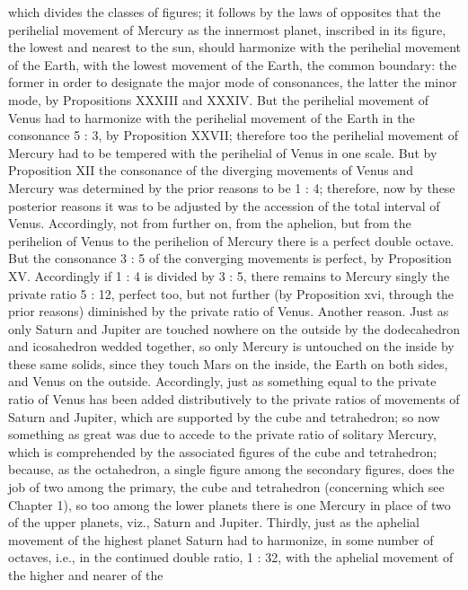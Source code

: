 \documentclass{article}
\begin{document}
which divides the classes of figures; it follows by the laws of opposites
that the perihelial movement of Mercury as the innermost planet,
inscribed in its figure, the lowest and nearest to the sun, should
harmonize with the perihelial movement of the Earth, with the lowest
movement of the Earth, the common boundary: the former in order to
designate the major mode of consonances, the latter the minor mode, by
Propositions XXXIII and XXXIV. But the perihelial movement of Venus
had to harmonize with the perihelial movement of the Earth in the
consonance 5 : 3, by Proposition XXVII; therefore too the perihelial
movement of Mercury had to be tempered with the perihelial of Venus in
one scale. But by Proposition XII the consonance of the diverging
movements of Venus and Mercury was determined by the prior reasons
to be 1 : 4; therefore, now by these posterior reasons it was to be adjusted
by the accession of the total interval of Venus. Accordingly, not from
further on, from the aphelion, but from the perihelion of Venus to the
perihelion of Mercury there is a perfect double octave. But the
consonance 3 : 5 of the converging movements is perfect, by Proposition
XV. Accordingly if 1 : 4 is divided by 3 : 5, there remains to Mercury
singly the private ratio 5 : 12, perfect too, but not further (by Proposition
xvi, through the prior reasons) diminished by the private ratio of Venus.
Another reason. Just as only Saturn and Jupiter are touched nowhere on
the outside by the dodecahedron and icosahedron wedded together, so
only Mercury is untouched on the inside by these same solids, since they
touch Mars on the inside, the Earth on both sides, and Venus on the
outside. Accordingly, just as something equal to the private ratio of
Venus has been added distributively to the private ratios of movements
of Saturn and Jupiter, which are supported by the cube and tetrahedron;
so now something as great was due to accede to the private ratio of
solitary Mercury, which is comprehended by the associated figures of the
cube and tetrahedron; because, as the octahedron, a single figure among
the secondary figures, does the job of two among the primary, the cube
and tetrahedron (concerning which see Chapter 1), so too among the
lower planets there is one Mercury in place of two of the upper
planets, viz., Saturn and Jupiter.
Thirdly, just as the aphelial movement of the highest planet Saturn had
to harmonize, in some number of octaves, i.e., in the continued double
ratio, 1 : 32, with the aphelial movement of the higher and nearer of the
\end{document}
